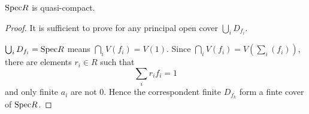 \begin{secprop}
$\text{Spec} R$ is quasi-compact.
\end{secprop}
\begin{proof}
	It is sufficient to prove for any principal open cover $\bigcup_i D_{f_i}$.
	
	$\bigcup_i D_{f_i} =\text{Spec} R$ means $\bigcap_i V(f_i) = V(1)$. Since $\bigcap_i V(f_i)= V(\sum_i (f_i))$, there are elements $r_i \in R$ such that 
	\[
	\sum_i r_i f_i = 1
	\] and only finite $a_i$ are not 0. Hence the correspondent finite $D_{f_k}$ form a finte cover of $\text{Spec} R$.
\end{proof}